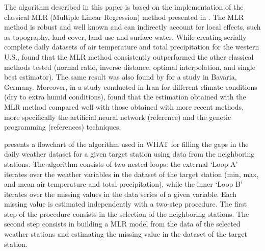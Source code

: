 \documentclass[TechnicalNoteMeteo.tex]{subfiles}
\begin{document}
The algorithm described in this paper is based on the implementation of the classical MLR (Multiple Linear Regression) method presented in \cite{eischeid_creating_2000}. The MLR method is robust and well known and can indirectly account for local effects, such as topography, land cover, land use and surface water. While creating serially complete daily datasets of air temperature and total precipitation for the western U.S., \cite{eischeid_creating_2000} found that the MLR method consistently outperformed the other classical methods tested (normal ratio, inverse distance, optimal interpolation, and single best estimator). The same result was also found by \cite{xia_forest_1999} for a study in Bavaria, Germany. Moreover, in a study conducted in Iran for different climate conditions (dry to extra humid conditions), \cite{kashani_evaluation_2011} found that the estimation obtained with the MLR method compared well with those obtained with more recent methods, more specifically the artificial neural network (reference) and the genetic programming (references) techniques.

 presents a flowchart of the algorithm used in WHAT for filling the gaps in the daily weather dataset for a given target station using data from the neighboring stations. The algorithm consists of two nested loops: the external `Loop A' iterates over the weather variables in the dataset of the target station (min, max, and mean air temperature and total precipitation), while the inner `Loop B' iterates over the missing values in the data series of a given variable. Each missing value is estimated independently with a two-step procedure. The first step of the procedure consists in the selection of the neighboring stations. The second step consists in building a MLR model from the data of the selected weather stations and estimating the missing value in the dataset of the target station. 
\end{document}
